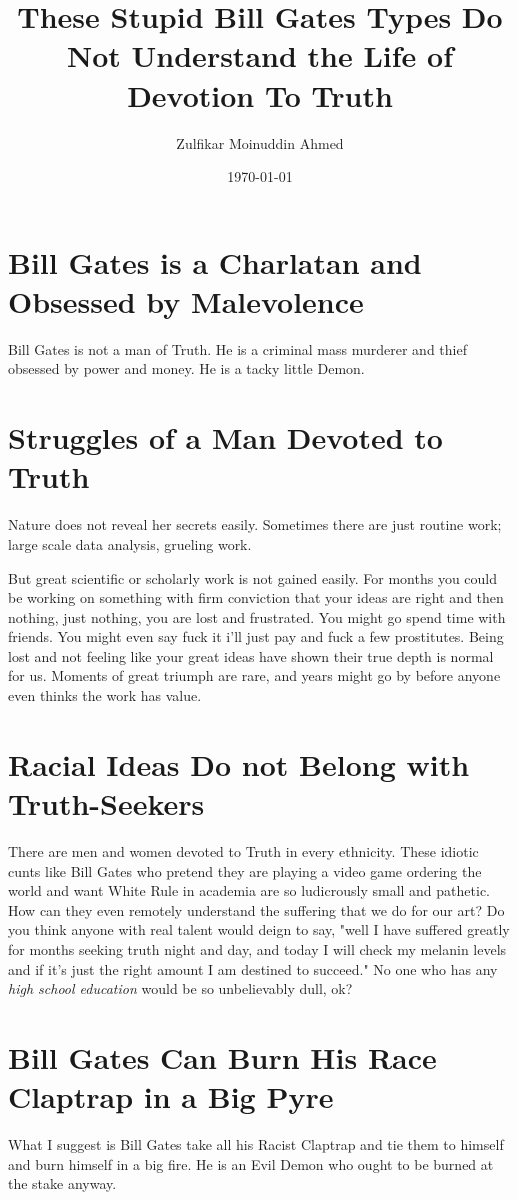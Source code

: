 \documentclass{amsart}
\title{These Stupid Bill Gates Types Do Not Understand the Life of Devotion To Truth}
\author{Zulfikar Moinuddin Ahmed}
\date{\today}
\begin{document}
\maketitle

\section{Bill Gates is a Charlatan and Obsessed by Malevolence}

Bill Gates is not a man of Truth.  He is a criminal mass murderer and thief obsessed by power and money.  He is a tacky little Demon.  

\section{Struggles of a Man Devoted to Truth}

Nature does not reveal her secrets easily.  Sometimes there are just routine work; large scale data analysis, grueling work.  

But great scientific or scholarly work is not gained easily.  For months you could be working on something with firm conviction that your ideas are right and then nothing, just nothing, you are lost and frustrated.  You might go spend time with friends.  You might even say fuck it i'll just pay and fuck a few prostitutes.  Being lost and not feeling like your great ideas have shown their true depth is normal for us. Moments of great triumph are rare, and years might go by before anyone even thinks the work has value. 

\section{Racial Ideas Do not Belong with Truth-Seekers}

There are men and women devoted to Truth in every ethnicity.  These idiotic cunts like Bill Gates who pretend they are playing a video game ordering the world and want White Rule in academia are so ludicrously small and pathetic.  How can they even remotely understand the suffering that we do for our art?  Do you think anyone with real talent would deign to say, "well I have suffered greatly for months seeking truth night and day, and today I will check my melanin levels and if it's just the right amount I am destined to succeed."  No one who has any {\em high school education} would be so unbelievably dull, ok?

\section{Bill Gates Can Burn His Race Claptrap in a Big Pyre}

What I suggest is Bill Gates take all his Racist Claptrap and tie them to himself and burn himself in a big fire.  He is an Evil Demon who ought to be burned at the stake anyway. 
\end{document}
